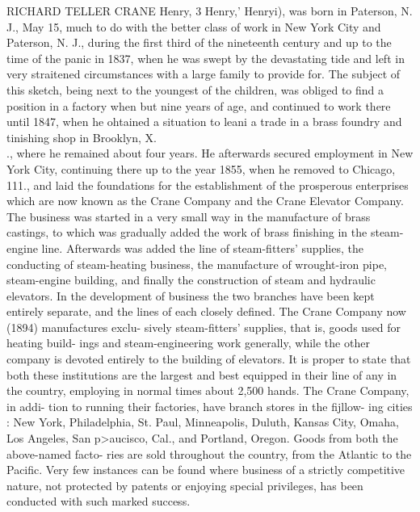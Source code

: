 \documentclass[oneside]{book}
\begin{document}
RICHARD TELLER CRANE Henry, 3 Henry,' Henryi), was born in Paterson, N. J., May 15, 
much to do with the better class of work in New York City and 
Paterson, N. J., during the first third of the nineteenth century 
and up to the time of the panic in 1837, when he was swept by 
the devastating tide and left in very straitened circumstances 
with a large family to provide for. The subject of this sketch, 
being next to the youngest of the children, was obliged to find a 
position in a factory when but nine years of age, and continued 
to work there until 1847, when he ohtained a situation to leani a 
trade in a brass foundry and tinishing shop in Brooklyn, X. \\ ., 
where he remained about four years. He afterwards secured 
employment in New York City, continuing there up to the year 
1855, when he removed to Chicago, 111., and laid the foundations 
for the establishment of the prosperous enterprises which are now 
known as the Crane Company and the Crane Elevator Company. 
The business was started in a very small way in the manufacture 
of brass castings, to which was gradually added the work of brass 
finishing in the steam-engine line. Afterwards was added the 
line of steam-fitters' supplies, the conducting of steam-heating 
business, the manufacture of wrought-iron pipe, steam-engine 
building, and finally the construction of steam and hydraulic 
elevators. In the development of business the two branches 
have been kept entirely separate, and the lines of each closely 
defined. The Crane Company now (1894) manufactures exclu- 
sively steam-fitters' supplies, that is, goods used for heating build- 
ings and steam-engineering work generally, while the other 
company is devoted entirely to the building of elevators. It is 
proper to state that both these institutions are the largest and 
best equipped in their line of any in the country, employing in 
normal times about 2,500 hands. The Crane Company, in addi- 
tion to running their factories, have branch stores in the fijllow- 
ing cities : New York, Philadelphia, St. Paul, Minneapolis, 
Duluth, Kansas City, Omaha, Los Angeles, San p>aucisco, Cal., 
and Portland, Oregon. Goods from both the above-named facto- 
ries are sold throughout the country, from the Atlantic to the 
Pacific. Very few instances can be found where business of a 
strictly competitive nature, not protected by patents or enjoying 
special privileges, has been conducted with such marked success. 
\end{document}
